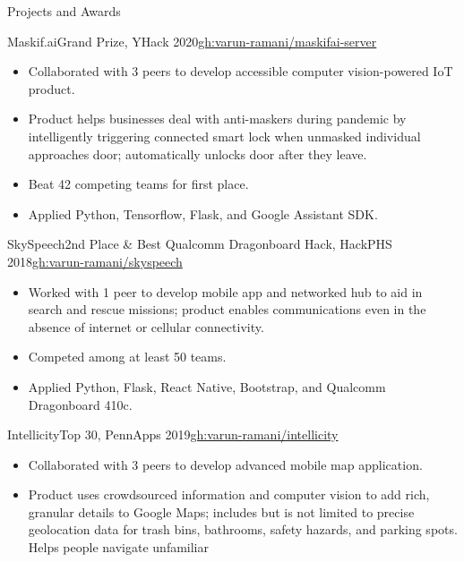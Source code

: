 \documentclass[]{mcdowellcv}
\begin{document}
	\begin{cvsection}{Projects and Awards}
		\begin{cvsubsection}{Maskif.ai}{Grand Prize, YHack 2020}{\href{https://github.com/varun-ramani/maskifai-server}{gh:varun-ramani/maskifai-server}}
			\begin{itemize}
				\item Collaborated with 3 peers to develop accessible computer vision-powered IoT product.
				\item Product helps businesses deal with anti-maskers during pandemic by intelligently 
				triggering connected smart lock when unmasked individual approaches door; 
				automatically unlocks door after they leave.
				\item Beat 42 competing teams for first place.
				\item Applied Python, Tensorflow, Flask, and Google Assistant SDK. 
			\end{itemize}
		\end{cvsubsection}
		\begin{cvsubsection}{SkySpeech}{2nd Place \& Best Qualcomm Dragonboard Hack, HackPHS 2018}{\href{https://github.com/varun-ramani/skyspeech}{gh:varun-ramani/skyspeech}}
			\vspace{0.8em}
			\begin{itemize}
				\item Worked with 1 peer to develop mobile app and networked hub to aid in search and rescue missions; 
				product enables communications even in the absence of internet or cellular connectivity.
				\item Competed among at least 50 teams.
				\item Applied Python, Flask, React Native, Bootstrap, and Qualcomm Dragonboard 410c.
			\end{itemize}
		\end{cvsubsection}
        \begin{cvsubsection}{Intellicity}{Top 30, PennApps 2019}{\href{https://github.com/varun-ramani/intellicity}{gh:varun-ramani/intellicity}}
			\begin{itemize}
				\item Collaborated with 3 peers to develop advanced mobile map application.
				\item Product uses crowdsourced information and computer vision to add rich, granular details
				to Google Maps; includes but is not limited to precise geolocation data for trash bins, bathrooms, 
				safety hazards, and parking spots. Helps people navigate unfamiliar

\end{itemize}
\end{cvsubsection}
\end{cvsection}
\end{document}
